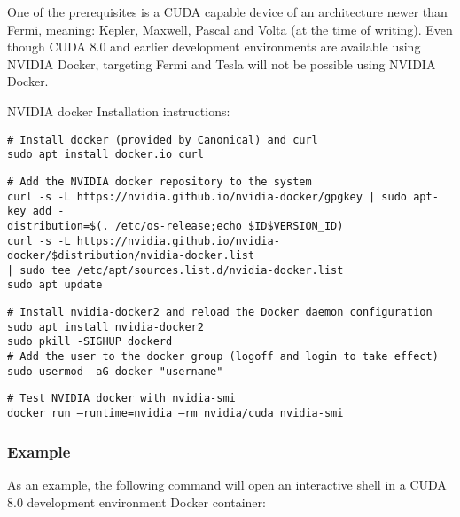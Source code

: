 One of the prerequisites is a CUDA capable device of an architecture newer than Fermi, meaning: Kepler, Maxwell, Pascal and Volta (at the time of writing). Even though CUDA 8.0 and earlier development environments are available using NVIDIA Docker, targeting Fermi and Tesla will not be possible using NVIDIA Docker.\vspace{5mm}

\noindent NVIDIA docker Installation instructions:\vspace{5mm}

\noindent \texttt{\# Install docker (provided by Canonical) and curl}\\
\texttt{sudo apt install docker.io curl}\vspace{4mm}

\noindent \texttt{\# Add the NVIDIA docker repository to the system}\\
\texttt{curl -s -L https://nvidia.github.io/nvidia-docker/gpgkey | sudo apt-key add -}\\
\texttt{distribution=\$(. /etc/os-release;echo \$ID\$VERSION\_ID)}\\
\texttt{curl -s -L https://nvidia.github.io/nvidia-docker/\$distribution/nvidia-docker.list}\\
\texttt{| sudo tee /etc/apt/sources.list.d/nvidia-docker.list}\\
\texttt{sudo apt update}\vspace{4mm}

\noindent \texttt{\# Install nvidia-docker2 and reload the Docker daemon configuration}\\
\texttt{sudo apt install nvidia-docker2}\\
\texttt{sudo pkill -SIGHUP dockerd}\\

\noindent \texttt{\# Add the user to the docker group (logoff and login to take effect)}\\
\texttt{sudo usermod -aG docker "username"}\vspace{4mm}

\noindent \texttt{\# Test NVIDIA docker with nvidia-smi}\\
\texttt{docker run --runtime=nvidia --rm nvidia/cuda nvidia-smi}

\newpage

\subsubsection*{Example}

\hspace{4mm}As an example, the following command will open an interactive shell in a CUDA 8.0 development environment Docker container:\vspace{5mm}

